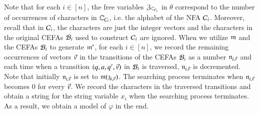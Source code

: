 Note that for each $i \in [n]$, the free variables $\mathfrak{Z}_{\mathbb{C}_{\mathcal{C}_i}}$ in $\theta$ correspond to the number of occurrences of characters in $\mathbb{C}_{\mathcal{C}_i}$, i.e. the alphabet of the NFA $\mathcal{C}_i$. Moreover, recall that in $\mathcal{C}_i$, the characters are just the integer vectors and the characters in the original CEFAs $\mathcal{B}_i$ used to construct $\mathcal{C}_i$ are ignored. 
When we utilize $\mathfrak{m}$ and the CEFAs $\mathcal{B}_i$ to generate $\mathfrak{m}'$, for each $i \in [n]$, we record the remaining occurrences of vectors $\vec{v}$ in the transitions of the CEFAs $\mathcal{B}_i$ as a number $\mathfrak{n}_{i, \vec{v}}$ and
each time when a transition $(q, a, q', \vec{v})$ in $\mathcal{B}_i$ is traversed, $\mathfrak{n}_{i, \vec{v}}$ is decremented. Note that initially $\mathfrak{n}_{i, \vec{v}}$ is set to $\mathfrak{m}(\mathfrak{z}_{i, \vec{v}})$. The searching process terminates when $\mathfrak{n}_{i, \vec{v}}$ becomes $0$ for every $\vec{v}$. We record the characters in the traversed transitions and obtain a string for the string variable $x_i$ when the searching process terminates. As a result, we obtain a model of $\varphi$ in the end. 

